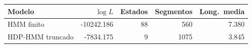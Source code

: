 \begin{tabular}{@{}lrrrr@{}}
\hline
Modelo & $\log L$ & Estados & Segmentos & Long.\ media \\
\hline
HMM finito & -10242.186 & 88 & 560 & 7.380 \\
HDP-HMM truncado & -7834.175 & 9 & 1075 & 3.845 \\
\hline
\end{tabular}
